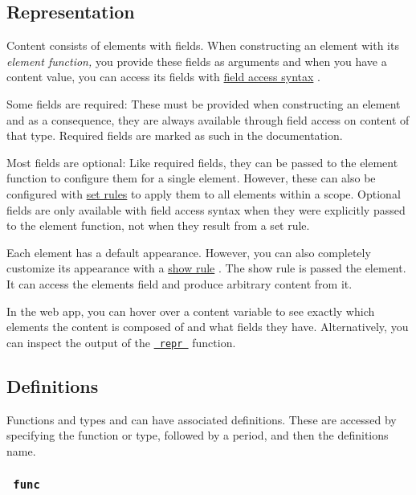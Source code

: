 \subsection{Representation}\label{representation}

Content consists of elements with fields. When constructing an element
with its \emph{element function,} you provide these fields as arguments
and when you have a content value, you can access its fields with
\href{/docs/reference/scripting/\#field-access}{field access syntax} .

Some fields are required: These must be provided when constructing an
element and as a consequence, they are always available through field
access on content of that type. Required fields are marked as such in
the documentation.

Most fields are optional: Like required fields, they can be passed to
the element function to configure them for a single element. However,
these can also be configured with
\href{/docs/reference/styling/\#set-rules}{set rules} to apply them to
all elements within a scope. Optional fields are only available with
field access syntax when they were explicitly passed to the element
function, not when they result from a set rule.

Each element has a default appearance. However, you can also completely
customize its appearance with a
\href{/docs/reference/styling/\#show-rules}{show rule} . The show rule
is passed the element. It can access the element\textquotesingle s field
and produce arbitrary content from it.

In the web app, you can hover over a content variable to see exactly
which elements the content is composed of and what fields they have.
Alternatively, you can inspect the output of the
\href{/docs/reference/foundations/repr/}{\texttt{\ repr\ }} function.

\subsection{\texorpdfstring{{ Definitions
}}{ Definitions }}\label{definitions}

\label{definitions-tooltip}
Functions and types and can have associated definitions. These are
accessed by specifying the function or type, followed by a period, and
then the definition\textquotesingle s name.

\subsubsection{\texorpdfstring{\texttt{\ func\ }}{ func }}\label{definitions-func}

